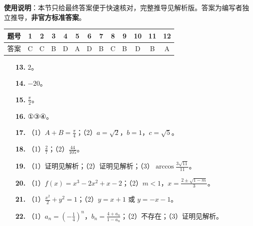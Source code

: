 
\begin{gknotice}
\textbf{使用说明}：本节只给最终答案便于快速核对，完整推导见解析版。答案为编写者独立推导，\textbf{非官方标准答案}。
\end{gknotice}

\begin{center}\begin{tabular}{ccccccccccccc}
\toprule
题号 & 1 & 2 & 3 & 4 & 5 & 6 & 7 & 8 & 9 & 10 & 11 & 12 \\
\midrule
答案 & C & C & B & D & A & D & B & C & B & D & B & A \\
\bottomrule
\end{tabular}\end{center}

\begin{itemize}[leftmargin=2.6em]
  \item[\textbf{13.}] $2$。
  \item[\textbf{14.}] $-20$。
  \item[\textbf{15.}] $\frac{\pi}{2}$。
  \item[\textbf{16.}] ①③④。
\end{itemize}

\begin{itemize}[leftmargin=2.6em]
  \item[\textbf{17.}] （1）$A+B=\frac{\pi}{4}$；（2）$a=\sqrt2$，$b=1$，$c=\sqrt5$。
  \item[\textbf{18.}] （1）$\frac27$；（2）$\frac{44}{105}$。
  \item[\textbf{19.}] （1）证明见解析；（2）证明见解析；（3）$\arccos\frac{3\sqrt{11}}{11}$。
  \item[\textbf{20.}] （1）$f(x)=x^3-2x^2+x-2$；（2）$m<1$，$x=\frac{2\pm\sqrt{1-m}}{3}$。
  \item[\textbf{21.}] （1）$\frac{x^2}{2}+y^2=1$；（2）$y=x+1$ 或 $y=-x-1$。
  \item[\textbf{22.}] （1）$a_n=\left(-\frac14\right)^n$，$b_n=\frac{4+a_n}{1-a_n}$；（2）不存在；（3）证明见解析。
\end{itemize}
